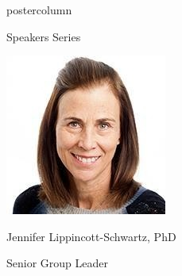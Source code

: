 \documentclass{beamer}
\begin{document}
\begin{frame}
\begin{columns}
\begin{column}{.33\textwidth}
\begin{beamercolorbox}[center,wd=\textwidth]{postercolumn}
\begin{minipage}[T]{.95\textwidth}
{\begin{myblock}{Speakers Series}
            \begin{addmargin}[1em]{1em}
                \centering
                \begin{minipage}{0.4\linewidth}
                    \includegraphics[width=\linewidth]{img/jennifer.png}
                    \centerline{Jennifer Lippincott-Schwartz, PhD}\newline
                    \centerline{Senior Group Leader}
                \end{minipage}
                \hspace{0.75cm}
                \begin{minipage}{0.4\linewidth}

\end{minipage}
\end{addmargin}
\end{myblock}}
\end{minipage}
\end{beamercolorbox}
\end{column}
\end{columns}
\end{frame}
\end{document}
